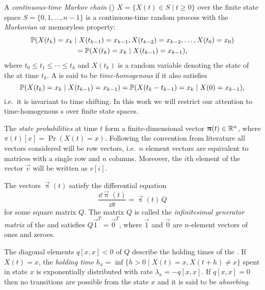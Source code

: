 \begin{dfn}
  A \emph{continuous-time Markov chain} ()
  \(X = \{ X(t) \in S \mid t \ge 0 \}\) over the finite state
  space $S = \{0, 1, \ldots, n - 1\}$ is a continuous-time random
  process with the \emph{Markovian} or memoryless property:
  \begin{multline}\allowdisplaybreaks[0]
    \Pr(X(t_k) = x_k \mid X(t_{k - 1}) = x_{k - 1}, X(t_{k -
      2}) = x_{k - 2}, \ldots, X(t_{0}) = x_{0}) \\
    = \Pr(X(t_k) = x_k \mid X(t_{k - 1}) = x_{k - 1}) \text,
  \end{multline}
  where $t_0 \le t_1 \le \cdots \le t_k$ and $X(t_k)$ is a random variable denoting the state of the  at time $t_k$. A  is said to be
  \emph{time-homogenous} if it also satisfies
  \begin{equation}
    \Pr(X(t_k) = x_k \mid X(t_{k - 1}) = x_{k - 1}) = \Pr(X(t_k - t_{k -
      1}) = x_k \mid X(0) = x_{k - 1}) \text,
  \end{equation}
  i.e.~it is invariant to time shifting. In this work we will restrict our attention to time-homogenous s over finite state spaces.
\end{dfn}

The \emph{state probabilities} at time $t$ form a finite-dimensional vector \(\vec{\uppi}(t) \in \RR^n\), where \(\pi(t)[x] = \Pr(X(t) = x)\). Following the convention from  literature all vectors considered will be row vectors, i.e.~\(n\) element vectors are equivalent to matrices with a single row and \(n\) columns. Moreover, the \(i\)th element of the vector \(\vec{v}\) will be written as \(v[i]\).

The vectors \(\vec{\uppi}(t)\) satisfy the differential equation
\begin{equation}
  \label{eq:background:ctmc-diffeq}
  \frac{\dd \vec{\uppi}(t)}{\dd t} = \vec{\uppi}(t) \, Q
\end{equation}
for some square matrix $Q$. The matrix $Q$ is called the \emph{infinitesimal generator matrix} of the  and satisfies \(Q \vec{1}^T = \vec{0}^T\), where \(\vec{1}\) and \(\vec{0}\) are \(n\)-element vectors of ones and zeroes.

The diagonal elements \(q[x, x] < 0\) of \(Q\) describe the holding times of the . If \(X(t) = x\), the \emph{holding time} \(h_x = \inf \{ h > 0 \mid X(t) = x, X(t + h) \ne x \}\) spent in state \(x\) is exponentially distributed with rate \(\lambda_x = -q[x, x]\). If \(q[x, x] = 0\) then no transitions are possible from the state $x$ and it is said to be \emph{absorbing}.

